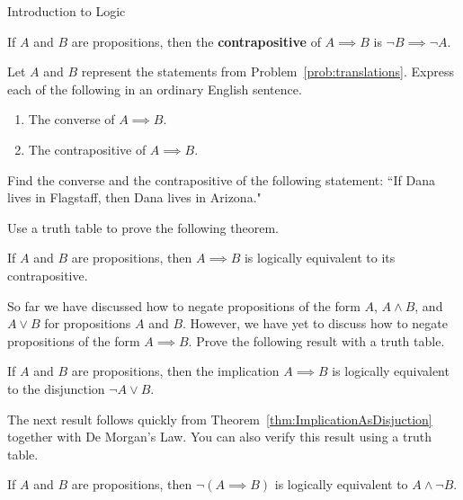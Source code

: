 \begin{section}{Introduction to Logic}
\begin{definition}
If $A$ and $B$ are propositions, then the \textbf{contrapositive} of $A \implies B$ is $\neg B \implies \neg A$.
\end{definition}

\begin{problem}
Let $A$ and $B$ represent the statements from Problem~\ref{prob:translations}.  Express each of the following in an ordinary English sentence.
\begin{enumerate}[label=\textrm{(\alph*)}]
\item The converse of $A \implies B$.
\item The contrapositive of $A \implies B$.
\end{enumerate}
\end{problem}

\begin{problem}
Find the converse and the contrapositive of the following statement: ``If Dana lives in Flagstaff, then Dana lives in Arizona."
\end{problem}

Use a truth table to prove the following theorem.

\begin{theorem}\label{thm:contrapos}
If $A$ and $B$ are propositions, then ${A\implies B}$ is logically equivalent to its contrapositive.
\end{theorem}

So far we have discussed how to negate propositions of the form $A$, $A\wedge B$, and $A\vee B$ for propositions $A$ and $B$.  However, we have yet to discuss how to negate propositions of the form $A\implies B$.  Prove the following result with a truth table.

\begin{theorem}\label{thm:ImplicationAsDisjuction}
If $A$ and $B$ are propositions, then the implication $A\implies B$ is logically equivalent to the disjunction $\neg A \vee B$.
\end{theorem}

The next result follows quickly from Theorem~\ref{thm:ImplicationAsDisjuction} together with De Morgan's Law. You can also verify this result using a truth table.

\begin{corollary}\label{cor:NegateImplication}
If $A$ and $B$ are propositions, then $\neg(A \implies B)$ is logically equivalent to $A \wedge \neg B$.
\end{corollary}


\end{section}
